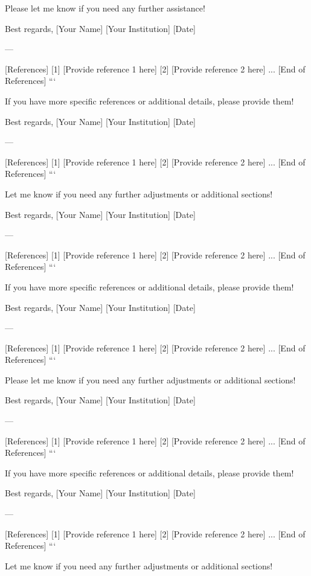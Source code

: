 Please let me know if you need any further assistance! 

Best regards,  
[Your Name]  
[Your Institution]  
[Date]  

--- 

[References]  
[1] [Provide reference 1 here]  
[2] [Provide reference 2 here]  
...  
[End of References]  
``` 

If you have more specific references or additional details, please provide them! 

Best regards,  
[Your Name]  
[Your Institution]  
[Date]  

--- 

[References]  
[1] [Provide reference 1 here]  
[2] [Provide reference 2 here]  
...  
[End of References]  
``` 

Let me know if you need any further adjustments or additional sections! 

Best regards,  
[Your Name]  
[Your Institution]  
[Date]  

--- 

[References]  
[1] [Provide reference 1 here]  
[2] [Provide reference 2 here]  
...  
[End of References]  
``` 

If you have more specific references or additional details, please provide them! 

Best regards,  
[Your Name]  
[Your Institution]  
[Date]  

--- 

[References]  
[1] [Provide reference 1 here]  
[2] [Provide reference 2 here]  
...  
[End of References]  
``` 

Please let me know if you need any further adjustments or additional sections! 

Best regards,  
[Your Name]  
[Your Institution]  
[Date]  

--- 

[References]  
[1] [Provide reference 1 here]  
[2] [Provide reference 2 here]  
...  
[End of References]  
``` 

If you have more specific references or additional details, please provide them! 

Best regards,  
[Your Name]  
[Your Institution]  
[Date]  

--- 

[References]  
[1] [Provide reference 1 here]  
[2] [Provide reference 2 here]  
...  
[End of References]  
``` 

Let me know if you need any further adjustments or additional sections! 

